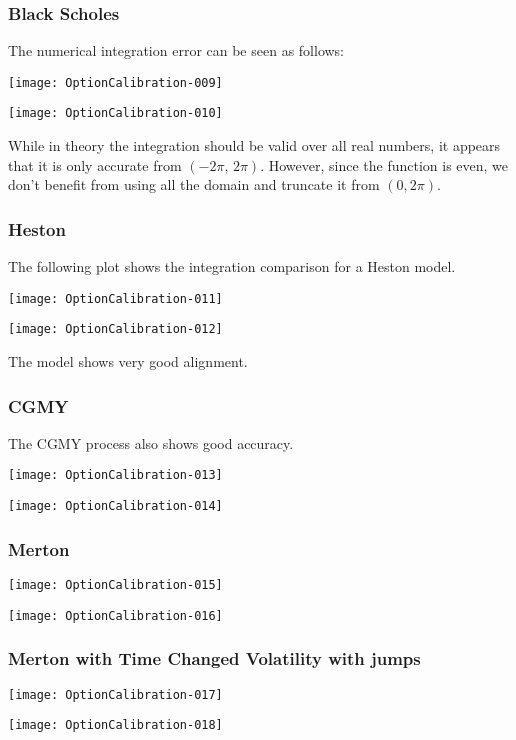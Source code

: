 \documentclass{article}
\begin{document}
\subsubsection{Black Scholes}
The numerical integration error can be seen as follows:

\texttt{[image: OptionCalibration-009]}

\texttt{[image: OptionCalibration-010]}




While in theory the integration should be valid over all real numbers, it appears that it is only accurate from \((-2\pi,\,2\pi)\).  However, since the function is even, we don't benefit from using all the domain and truncate it from \((0, 2 \pi)\).

\subsubsection{Heston}

The following plot shows the integration comparison for a Heston model.

\texttt{[image: OptionCalibration-011]}

\texttt{[image: OptionCalibration-012]}

The model shows very good alignment.


\subsubsection{CGMY}

The CGMY process also shows good accuracy.

\texttt{[image: OptionCalibration-013]}

\texttt{[image: OptionCalibration-014]}



\subsubsection{Merton}

\texttt{[image: OptionCalibration-015]}

\texttt{[image: OptionCalibration-016]}


\subsubsection{Merton with Time Changed Volatility with jumps}
\texttt{[image: OptionCalibration-017]}

\texttt{[image: OptionCalibration-018]}
\end{document}
